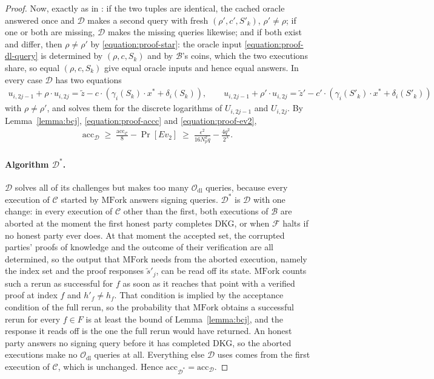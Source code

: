 \documentclass{article}
\theoremstyle{plain}
\theoremstyle{definition}
\theoremstyle{remark}
\begin{document}
\begin{proof}
  Now, exactly as in \cite{cgrs23}: if the two tuples are identical, the cached oracle answered once and $\mathcal{D}$ makes a second query with fresh $(\rho', c', S'_k)$, $\rho' \ne \rho$; if one or both are missing, $\mathcal{D}$ makes the missing queries likewise; and if both exist and differ, then $\rho \ne \rho'$ by \eqref{equation:proof-star}: the oracle input \eqref{equation:proof-dl-query} is determined by $(\rho, c, S_k)$ and by $\mathcal{B}$'s coins, which the two executions share, so equal $(\rho, c, S_k)$ give equal oracle inputs and hence equal answers.  In every case $\mathcal{D}$ has two equations
  \begin{align}
    u_{i,2j-1} + \rho \cdot u_{i,2j} = \tilde{z} - c \cdot (\gamma_i(S_k) \cdot x^* + \delta_i(S_k)), \qquad u_{i,2j-1} + \rho' \cdot u_{i,2j} = \tilde{z}' - c' \cdot (\gamma_i(S'_k) \cdot x^* + \delta_i(S'_k))
  \end{align}
  with $\rho \ne \rho'$, and solves them for the discrete logarithms of $U_{i,2j-1}$ and $U_{i,2j}$.  By Lemma~\ref{lemma:bcj}, \eqref{equation:proof-accc} and \eqref{equation:proof-ev2},
  \begin{align}\label{equation:proof-accd}
    \mathrm{acc}_{\mathcal{D}} \;\ge\; \frac{\mathrm{acc}_{\mathcal{C}}}{8} - \Pr[\mathit{Ev}_2] \;\ge\; \frac{\epsilon^2}{16 N_p^2 q} - \frac{4q^2}{2^{\lambda}}.
  \end{align}

  \paragraph{Algorithm $\mathcal{D}^*$.}  $\mathcal{D}$ solves all of its challenges but makes too many $\mathcal{O}_{\mathrm{dl}}$ queries, because every execution of $\mathcal{C}$ started by $\mathrm{MFork}$ answers signing queries.  $\mathcal{D}^*$ is $\mathcal{D}$ with one change: in every execution of $\mathcal{C}$ other than the first, both executions of $\mathcal{B}$ are aborted at the moment the first honest party completes DKG, or when $\mathcal{F}$ halts if no honest party ever does.  At that moment the accepted set, the corrupted parties' proofs of knowledge and the outcome of their verification are all determined, so the output that $\mathrm{MFork}$ needs from the aborted execution, namely the index set and the proof responses $\tilde{s}'_j$, can be read off its state.  $\mathrm{MFork}$ counts such a rerun as successful for $f$ as soon as it reaches that point with a verified proof at index $f$ and $h'_f \ne h_f$.  That condition is implied by the acceptance condition of the full rerun, so the probability that $\mathrm{MFork}$ obtains a successful rerun for every $f \in F$ is at least the bound of Lemma~\ref{lemma:bcj}, and the response it reads off is the one the full rerun would have returned.  An honest party answers no signing query before it has completed DKG, so the aborted executions make no $\mathcal{O}_{\mathrm{dl}}$ queries at all.  Everything else $\mathcal{D}$ uses comes from the first execution of $\mathcal{C}$, which is unchanged.  Hence $\mathrm{acc}_{\mathcal{D}^*} = \mathrm{acc}_{\mathcal{D}}$.


\end{proof}
\end{document}
